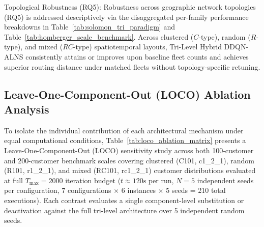 \documentclass{ieeeaccess}
\begin{document}
Topological Robustness (RQ5): Robustness across geographic network topologies (RQ5) is addressed descriptively via the disaggregated per-family performance breakdowns in Table~\ref{tab:solomon_tri_paradigm} and Table~\ref{tab:homberger_scale_benchmark}. Across clustered ($C$-type), random ($R$-type), and mixed ($RC$-type) spatiotemporal layouts, Tri-Level Hybrid DDQN-ALNS consistently attains or improves upon baseline fleet counts and achieves superior routing distance under matched fleets without topology-specific retuning.

\subsection{Leave-One-Component-Out (LOCO) Ablation Analysis}
\label{sec:ablation_results}

To isolate the individual contribution of each architectural mechanism under equal computational conditions, Table~\ref{tab:loco_ablation_matrix} presents a Leave-One-Component-Out (LOCO) sensitivity study across both 100-customer and 200-customer benchmark scales covering clustered (C101, c1\_2\_1), random (R101, r1\_2\_1), and mixed (RC101, rc1\_2\_1) customer distributions evaluated at full $T_{\max}=2000$ iteration budget ($t \approx 120\text{s}$ per run, $N=5$ independent seeds per configuration, 7 configurations $\times$ 6 instances $\times$ 5 seeds = 210 total executions). Each contrast evaluates a single component-level substitution or deactivation against the full tri-level architecture over 5 independent random seeds.
\end{document}

